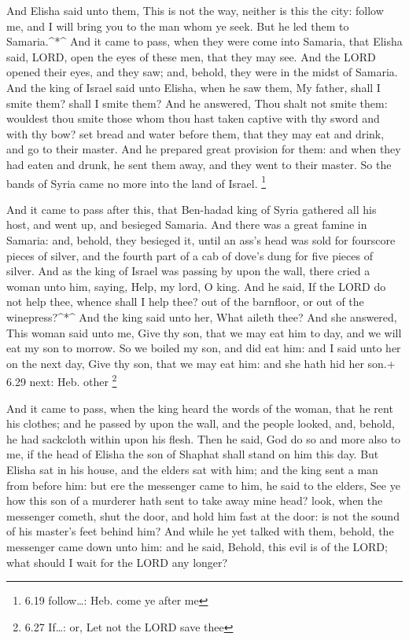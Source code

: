  And Elisha said unto them, This is not the way, neither is
this the city: follow me, and I will bring you to the man whom ye seek.
But he led them to Samaria.\^{}*\^{}  And it came to pass,
when they were come into Samaria, that Elisha said, LORD, open the eyes
of these men, that they may see. And the LORD opened their eyes, and
they saw; and, behold, they were in the midst of Samaria. 
And the king of Israel said unto Elisha, when he saw them, My father,
shall I smite them? shall I smite them?  And he answered,
Thou shalt not smite them: wouldest thou smite those whom thou hast
taken captive with thy sword and with thy bow? set bread and water
before them, that they may eat and drink, and go to their master.
 And he prepared great provision for them: and when they
had eaten and drunk, he sent them away, and they went to their master.
So the bands of Syria came no more into the land of Israel. \footnote{6.19
  follow\ldots: Heb. come ye after me}

 And it came to pass after this, that Ben-hadad king of
Syria gathered all his host, and went up, and besieged Samaria.
 And there was a great famine in Samaria: and, behold, they
besieged it, until an ass's head was sold for fourscore pieces of
silver, and the fourth part of a cab of dove's dung for five pieces of
silver.  And as the king of Israel was passing by upon the
wall, there cried a woman unto him, saying, Help, my lord, O king.
 And he said, If the LORD do not help thee, whence shall I
help thee? out of the barnfloor, or out of the winepress?\^{}*\^{}
 And the king said unto her, What aileth thee? And she
answered, This woman said unto me, Give thy son, that we may eat him to
day, and we will eat my son to morrow.  So we boiled my
son, and did eat him: and I said unto her on the next day, Give thy son,
that we may eat him: and she hath hid her son.+ 6.29 next: Heb. other
\footnote{6.27 If\ldots: or, Let not the LORD save thee}

 And it came to pass, when the king heard the words of the
woman, that he rent his clothes; and he passed by upon the wall, and the
people looked, and, behold, he had sackcloth within upon his flesh.
 Then he said, God do so and more also to me, if the head
of Elisha the son of Shaphat shall stand on him this day. 
But Elisha sat in his house, and the elders sat with him; and the king
sent a man from before him: but ere the messenger came to him, he said
to the elders, See ye how this son of a murderer hath sent to take away
mine head? look, when the messenger cometh, shut the door, and hold him
fast at the door: is not the sound of his master's feet behind him?
 And while he yet talked with them, behold, the messenger
came down unto him: and he said, Behold, this evil is of the LORD; what
should I wait for the LORD any longer?

